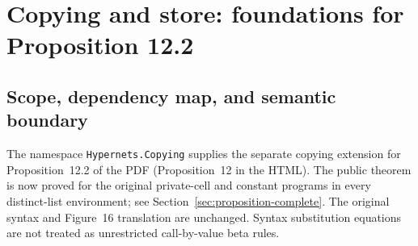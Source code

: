 \clearpage
\section{Copying and store: foundations for Proposition 12.2}
\label{sec:copying-foundations}
\subsection{Scope, dependency map, and semantic boundary}

The namespace \texttt{Hypernets.Copying} supplies the separate copying
extension for Proposition~12.2 of the PDF (Proposition~12 in the HTML).
The public theorem is now proved for the original private-cell and constant
programs in every distinct-list environment; see
Section~\ref{sec:proposition-complete}. The original syntax and Figure~16
translation are unchanged. Syntax substitution equations are not treated as
unrestricted call-by-value beta rules.

